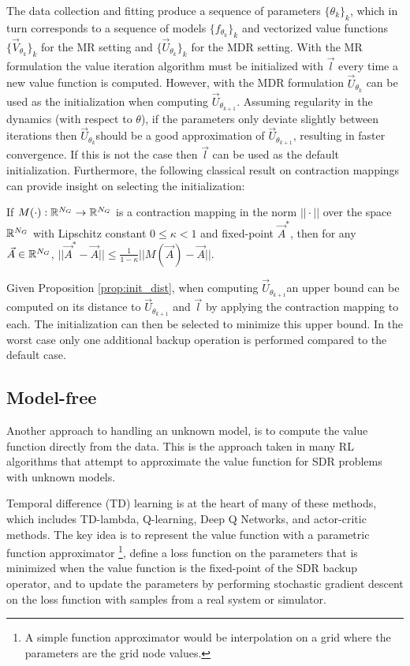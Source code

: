 The data collection and fitting produce a sequence of parameters $\{\theta_k\}_k$, which in turn corresponds to a sequence of models $\{f_{\theta_k}\}_k$ and vectorized value functions $\{\vec{V}_{\theta_k}\}_k$ for the MR setting and $\{\vec{U}_{\theta_k}\}_k$ for the MDR setting. With the MR formulation the value iteration algorithm must be initialized with $\vec{l}$ every time a new value function is computed. However, with the MDR formulation $\vec{U}_{\theta_k}$ can be used as the initialization when computing $\vec{U}_{\theta_{k+1}}$. Assuming regularity in the dynamics (with respect to $\theta$), if the parameters only deviate slightly between iterations then $\vec{U}_{\theta_{k}}$should be a good approximation of $\vec{U}_{\theta_{k+1}}$, resulting in faster convergence. If this is not the case then $\vec{l}$ can be used as the default initialization. Furthermore, the following classical result on contraction mappings can provide insight on selecting the initialization:  
%
\begin{proposition} \label{prop:init_dist}
If $M(\cdot): \mathbb{R}^{N_G} \rightarrow \mathbb{R}^{N_G}$ is a contraction mapping in the norm $|| \cdot ||$ over the space $\mathbb{R}^{N_G}$ with Lipschitz constant $0\leq \kappa < 1$ and fixed-point $\vec{A}^*$, then for any $\vec{A} \in \mathbb{R}^{N_G}$,  $||\vec{A}^* - \vec{A}|| \leq \frac{1}{1-\kappa}||M(\vec{A}) - \vec{A}||$. 
\end{proposition}

Given Proposition \ref{prop:init_dist}, when computing $\vec{U}_{\theta_{k+1}}$an upper bound can be computed on its distance to $\vec{U}_{\theta_{k+1}}$ and $\vec{l}$ by applying the contraction mapping to each. The initialization can then be selected to minimize this upper bound. In the worst case only one additional backup operation is performed compared to the default case. 

\subsection{Model-free}

Another approach to handling an unknown model, is to compute the value function directly from the data. This is the approach taken in many RL algorithms that attempt to approximate the value function for SDR problems with unknown models.

Temporal difference (TD) learning is at the heart of many of these methods, which includes TD-lambda, Q-learning, Deep Q Networks, and actor-critic methods. The key idea is to represent the value function with a parametric function approximator \footnote{A simple function approximator would be interpolation on a grid where the parameters are the grid node values.}, define a loss function on the parameters that is minimized when the value function is the fixed-point of the SDR backup operator, and to update the parameters by performing stochastic gradient descent on the loss function with samples from a real system or simulator.

